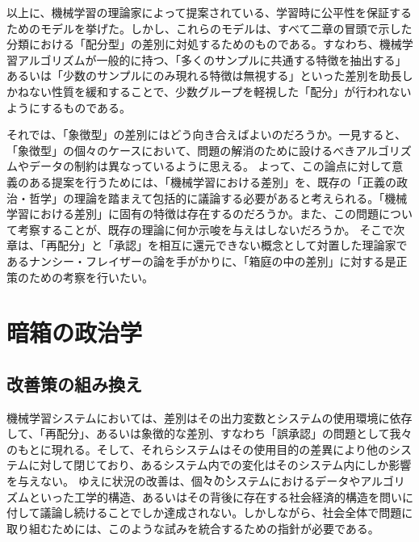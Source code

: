 \documentclass[b5j,twoside,twocolumn]{utarticle}
\begin{document}
以上に、機械学習の理論家によって提案されている、学習時に公平性を保証するためのモデルを挙げた。しかし、これらのモデルは、すべて二章の冒頭で示した分類における「配分型」の差別に対処するためのものである。すなわち、機械学習アルゴリズムが一般的に持つ、「多くのサンプルに共通する特徴を抽出する」あるいは「少数のサンプルにのみ現れる特徴は無視する」といった差別を助長しかねない性質を緩和することで、少数グループを軽視した「配分」が行われないようにするものである。


それでは、「象徴型」の差別にはどう向き合えばよいのだろうか。一見すると、「象徴型」の個々のケースにおいて、問題の解消のために設けるべきアルゴリズムやデータの制約は異なっているように思える。
よって、この論点に対して意義のある提案を行うためには、「機械学習における差別」を、既存の「正義の政治・哲学」の理論を踏まえて包括的に議論する必要があると考えられる。「機械学習における差別」に固有の特徴は存在するのだろうか。また、この問題について考察することが、既存の理論に何か示唆を与えはしないだろうか。
そこで次章は、「再配分」と「承認」を相互に還元できない概念として対置した理論家であるナンシー・フレイザーの論を手がかりに、「箱庭の中の差別」に対する是正策のための考察を行いたい。

\section{暗箱の政治学}
\subsection{改善策の組み換え}


機械学習システムにおいては、差別はその出力変数とシステムの使用環境に依存して、「再配分」、あるいは象徴的な差別、すなわち「誤承認」の問題として我々のもとに現れる。そして、それらシステムはその使用目的の差異により他のシステムに対して閉じており、あるシステム内での変化はそのシステム内にしか影響を与えない。
ゆえに状況の改善は、\.個\.々\.のシステムにおけるデータやアルゴリズムといった工学的構造、あるいはその背後に存在する社会経済的構造を問いに付して議論し続けることでしか達成されない。しかしながら、社会全体で問題に取り組むためには、このような試みを統合するための指針が必要である。
\end{document}
